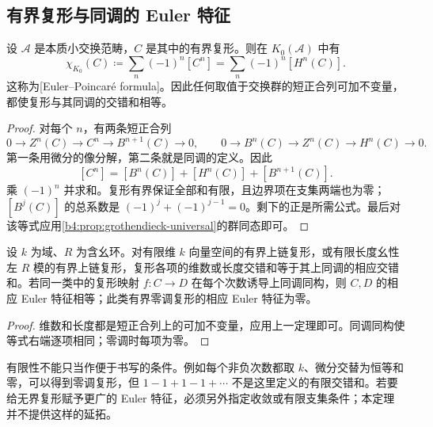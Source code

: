 \subsection{有界复形与同调的 Euler 特征}
\label{b4:subsec:0504:03}

\begin{theorem}\label{b4:thm:euler-poincare}
设 \(\mathcal A\) 是本质小交换范畴，\(C\) 是其中的有界复形。则在 \(K_0(\mathcal A)\) 中有
\[
\chi_{K_0}(C)\coloneqq\sum_n(-1)^n[C^n]
=\sum_n(-1)^n[H^n(C)].
\]
这称为[Euler–Poincaré formula]。因此任何取值于交换群的短正合列可加不变量，都使复形与其同调的交错和相等。
\end{theorem}
\begin{proof}
对每个 \(n\)，有两条短正合列
\[
0\to Z^n(C)\to C^n\to B^{n+1}(C)\to0,
\qquad
0\to B^n(C)\to Z^n(C)\to H^n(C)\to0.
\]
第一条用微分的像分解，第二条就是同调的定义。因此
\[
[C^n]=[B^n(C)]+[H^n(C)]+[B^{n+1}(C)].
\]
乘 \((-1)^n\) 并求和。复形有界保证全部和有限，且边界项在支集两端也为零；\([B^j(C)]\) 的总系数是 \((-1)^j+(-1)^{j-1}=0\)。剩下的正是所需公式。最后对该等式应用\cref{b4:prop:grothendieck-universal}的群同态即可。
\end{proof}

\begin{corollary}\label{b4:cor:euler-quasi-invariance}
设 \(k\) 为域、\(R\) 为含幺环。对有限维 \(k\) 向量空间的有界上链复形，或有限长度幺性左 \(R\) 模的有界上链复形，复形各项的维数或长度交错和等于其上同调的相应交错和。若同一类中的复形映射 \(f:C\to D\) 在每个次数诱导上同调同构，则 \(C,D\) 的相应 Euler 特征相等；此类有界零调复形的相应 Euler 特征为零。
\end{corollary}
\begin{proof}
维数和长度都是短正合列上的可加不变量，应用上一定理即可。同调同构使等式右端逐项相同；零调时每项为零。
\end{proof}

有限性不能只当作便于书写的条件。例如每个非负次数都取 \(k\)、微分交替为恒等和零，可以得到零调复形，但 \(1-1+1-1+\cdots\) 不是这里定义的有限交错和。若要给无界复形赋予更广的 Euler 特征，必须另外指定收敛或有限支集条件；本定理并不提供这样的延拓。
